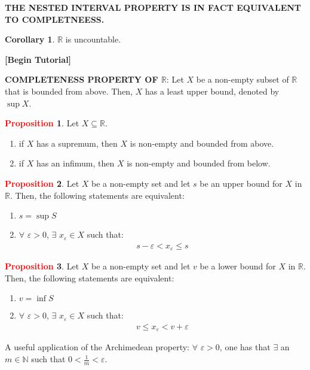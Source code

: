 \documentclass[11pt]{article}
\theoremstyle{definition}
\newcommand{\R}[0]{\mathbb{R}}
\newtheorem{corollary}{Corollary}
\theoremstyle{definition}
\newtheorem{prop}{\textcolor{red}{Proposition}}
\theoremstyle{remark}
\begin{document}
\begin{center}
	\textbf{THE NESTED INTERVAL PROPERTY IS IN FACT EQUIVALENT TO COMPLETNEESS.}
\end{center}

\begin{corollary}
	$\R$ is uncountable.
\end{corollary}

\begin{center}
	\textbf{[Begin Tutorial]}
\end{center}

\textbf{COMPLETENESS PROPERTY OF $\R$}: Let $X$ be a non-empty subset of $\R$ that is bounded from above. Then, $X$ has a least upper bound, denoted by $\sup{X}$. 


\begin{prop}
	Let $X \subseteq \R$. 
	\begin{enumerate}[noitemsep]
		\item if $X$ has a supremum, then $X$ is non-empty and bounded from above. 
		\item if $X$ has an infimum, then $X$ is non-empty and bounded from below.
	\end{enumerate}
\end{prop}


\begin{prop}
	Let $X$ be a non-empty set and let $s$ be an upper bound for $X$ in $\R$. Then, the following statements are equivalent: 
	\begin{enumerate}[noitemsep]
		\item $s = \sup{S}$
		\item $\forall $ $\varepsilon > 0$, $\exists$ $x_\varepsilon \in X$ such that:
		\begin{align}
			s - \varepsilon < x_\varepsilon \leq s	
		\end{align}
	\end{enumerate}
\end{prop}

\begin{prop}
	Let $X$ be a non-empty set and let $v$ be a lower bound for $X$ in $\R$. Then, the following statements are equivalent: 
	\begin{enumerate}[noitemsep]
		\item $v = \inf{S}$
		\item $\forall $ $\varepsilon > 0$, $\exists$ $x_\varepsilon \in X$ such that:
		\begin{align}
			v \leq x_\varepsilon < v + \varepsilon	
		\end{align}
	\end{enumerate}
\end{prop}
A useful application of the Archimedean property: $\forall $ $\varepsilon > 0$, one has that $\exists$ an $m \in \mathbb{N}$ such that $0 < \frac{1}{m} < \varepsilon$. 
\end{document}
